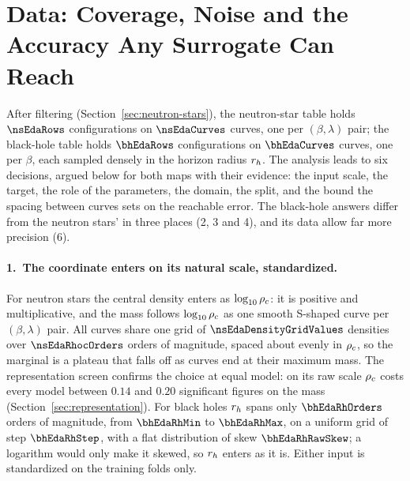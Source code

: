 \section{Data: Coverage, Noise and the Accuracy Any Surrogate Can Reach}
\label{sec:eda-ns}
\label{sec:eda-bh}

After filtering (Section~\ref{sec:neutron-stars}), the neutron-star table holds $\nsEdaRows$ configurations on $\nsEdaCurves$ curves, one per $(\beta, \lambda)$ pair; the black-hole table holds $\bhEdaRows$ configurations on $\bhEdaCurves$ curves, one per $\beta$, each sampled densely in the horizon radius $r_h$. The analysis leads to six decisions, argued below for both maps with their evidence: the input scale, the target, the role of the parameters, the domain, the split, and the bound the spacing between curves sets on the reachable error. The black-hole answers differ from the neutron stars' in three places (2, 3 and 4), and its data allow far more precision (6).

\paragraph{1.\ The coordinate enters on its natural scale, standardized.}
For neutron stars the central density enters as $\log_{10}\rho_c$: it is positive and multiplicative, and the mass follows $\log_{10}\rho_c$ as one smooth S-shaped curve per $(\beta, \lambda)$ pair. All curves share one grid of $\nsEdaDensityGridValues$ densities over $\nsEdaRhocOrders$ orders of magnitude, spaced about evenly in $\rho_c$, so the marginal is a plateau that falls off as curves end at their maximum mass. The representation screen confirms the choice at equal model: on its raw scale $\rho_c$ costs every model between $0.14$ and $0.20$ significant figures on the mass (Section~\ref{sec:representation}).
For black holes $r_h$ spans only $\bhEdaRhOrders$ orders of magnitude, from $\bhEdaRhMin$ to $\bhEdaRhMax$, on a uniform grid of step $\bhEdaRhStep$, with a flat distribution of skew $\bhEdaRhRawSkew$; a logarithm would only make it skewed, so $r_h$ enters as it is. Either input is standardized on the training folds only.

